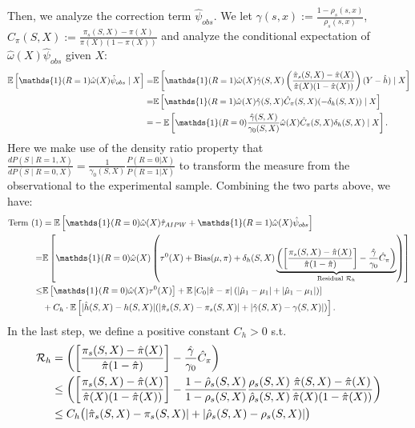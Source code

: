 \documentclass{article}
\theoremstyle{plain}
\theoremstyle{definition}
\theoremstyle{remark}
\newcommand{\E}{\mathbb{E}}                %
\newcommand{\1}{\mathds{1}}                %
\begin{document}
Then, we analyze the correction term $\hat\psi_{obs}$. We let $\gamma(s,x):=\frac{1- \rho_s(s,x)}{\rho_s(s,x)}$, $C_\pi(S,X):=\frac{\pi_s(S,X) - \pi(X)}{\pi(X)(1-\pi(X))}$ and analyze the conditional expectation of $\hat{\omega}(X) \hat\psi_{obs}$ given $X$:
\begin{align}
    \E\left[\1(R=1) \hat{\omega}(X) \hat\psi_{obs} \mid X\right] =& \E\left[ \1(R=1) \hat{\omega}(X) \hat{\gamma}(S,X) \left( \frac{\hat{\pi}_s(S,X) - \hat{\pi}(X)}{\hat{\pi}(X)(1-\hat{\pi}(X))} \right) (Y - \hat{h}) \mid X\right] \notag \\
    =& \E\left[ \1(R=1) \hat{\omega}(X) \hat{\gamma}(S,X) \hat{C}_\pi(S,X) (-\delta_h(S,X)) \mid X\right] \notag \\
    =& -\E\left[ \1(R=0) \frac{\hat{\gamma}(S,X)}{\gamma_0(S,X)} \hat{\omega}(X) \hat{C}_\pi(S,X) \delta_h(S,X) \mid X\right].
\end{align}
Here we make use of the density ratio property that $\frac{dP(S \mid R=1, X)}{dP(S \mid R=0, X)} = \frac{1}{\gamma_0(S,X)} \frac{P(R=0|X)}{P(R=1|X)}$ to transform the measure from the observational to the experimental sample.
Combining the two parts above, we have:
\begin{align}
    \text{Term (1)} &= \E\left[\1(R=0) \hat{\omega}(X) \hat{\tau}_{AIPW} + \1(R=1) \hat{\omega}(X) \hat\psi_{obs}\right] \notag \\
    =& \E\left[ \1(R=0) \hat{\omega}(X) \left( \tau^0(X) + \text{Bias}(\mu, \pi) + \delta_h(S,X) \underbrace{ \left( \left[ \frac{\pi_s(S,X) - \hat{\pi}(X)}{\hat{\pi}(1-\hat{\pi})} \right] - \frac{\hat{\gamma}}{\gamma_0} \hat{C}_\pi \right) }_{\text{Residual } \mathcal{R}_h} \right) \right] \notag \\
    \leq & \E\left[ \1(R=0) \hat{\omega}(X) \tau^0(X) \right] + \E\left[C_0|\hat{\pi}-\pi|\left(|\hat\mu_1-\mu_1|+|\hat\mu_1-\mu_1| \right)\right] \notag \\
    & + C_h\cdot\E\left[|\hat{h}(S,X) - h(S,X)| (|\hat\pi_s(S, X) - \pi_s(S,X)| + |\hat\gamma(S,X) - \gamma(S,X)|)\right].
    \label{term-1-bound}
\end{align}
In the last step, we define a positive constant $C_h > 0$ s.t.
\begin{align}
    \mathcal{R}_h &= \left( \left[ \frac{\pi_s(S,X) - \hat{\pi}(X)}{\hat{\pi}(1-\hat{\pi})} \right] - \frac{\hat{\gamma}}{\gamma_0} \hat{C}_\pi \right) \\
    & \leq \left( \left[ \frac{\pi_s(S,X) - \hat{\pi}(X)}{\hat{\pi}(X)(1-\hat{\pi}(X))} \right] - \frac{1-\hat{\rho}_s(S,X)}{1 - \rho_s(S,X)}  \frac{\rho_s(S,X)}{\hat\rho_s(S,X)} \frac{\hat{\pi}(S,X) - \hat{\pi}(X)}{\hat{\pi}(X)(1-\hat{\pi}(X))} \right) \notag \\
    & \leq C_h \bigl(|\hat\pi_s(S,X) - \pi_s(S,X)| + |\hat\rho_s(S,X) - \rho_s(S,X)|\bigr)
\end{align}
\end{document}
